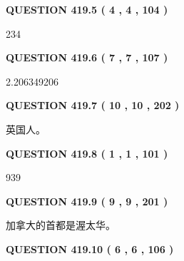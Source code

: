 \documentclass{ctexart}
\begin{document}
{\textbf{\Large{QUESTION
419.5 
 ( 4 , 4 , 104 )
}}}
  
  
 
 
\noindent{}

234
 
 
  
\vspace{0.2in}
  
{\textbf{\Large{QUESTION
419.6 
 ( 7 , 7 , 107 )
}}}
  
  
 
 
\noindent{}

2.206349206
 
 
  
\vspace{0.2in}
  
{\textbf{\Large{QUESTION
419.7 
 ( 10 , 10 , 202 )
}}}
  
  
 
 
\noindent{}
 
 
英国人。
 
 
 
 
  
\vspace{0.2in}
  
{\textbf{\Large{QUESTION
419.8 
 ( 1 , 1 , 101 )
}}}
  
  
 
 
\noindent{}

939
 
 
  
\vspace{0.2in}
  
{\textbf{\Large{QUESTION
419.9 
 ( 9 , 9 , 201 )
}}}
  
  
 
 
\noindent{}
 
 
加拿大的首都是渥太华。
 
 
 
 
  
\vspace{0.2in}
  
{\textbf{\Large{QUESTION
419.10 
 ( 6 , 6 , 106 )
}}}
  
\end{document}
